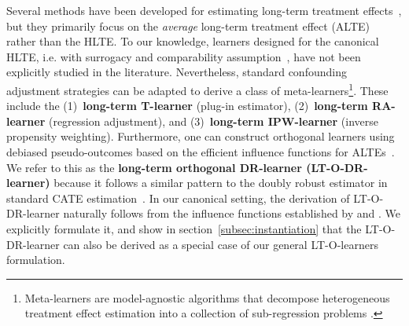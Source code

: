\documentclass{article}
\theoremstyle{plain}
\theoremstyle{definition}
\theoremstyle{remark}
\newcommand{\1}{\mathds{1}}                %
\newcommand{\methods}{LT-O-learners\xspace}
\newcommand{\DR}{LT-O-DR-learner\xspace}
\begin{document}
Several methods have been developed for estimating long-term treatment effects~\citep[e.g.,][]{Athey.2016,Chen.2023,Athey.2025}, but they primarily focus on the \textit{average} long-term treatment effect (ALTE) rather than the HLTE. To our knowledge, learners designed for the canonical HLTE, i.e. with surrogacy and comparability assumption~\cite{Athey.2025}, have not been explicitly studied in the literature. Nevertheless, standard confounding adjustment strategies can be adapted to derive a class of meta-learners\footnote{Meta-learners are model-agnostic algorithms that decompose heterogeneous treatment effect estimation into a collection of sub-regression problems \cite{Kunzel.2019, Curth.2021}.}. These include the (1)~\textbf{long-term T-learner} (plug-in estimator), (2)~\textbf{long-term RA-learner} (regression adjustment), and (3)~\textbf{long-term IPW-learner} (inverse propensity weighting). Furthermore, one can construct orthogonal learners using debiased pseudo-outcomes based on the efficient influence functions for ALTEs~\citep{Chen.2025}. We refer to this as the \textbf{long-term orthogonal DR-learner (\DR)} because it follows a similar pattern to the doubly robust estimator in standard CATE estimation~\citep{Kennedy.2020-DR-learner}. In our canonical setting, the derivation of \DR naturally follows from the influence functions established by \citet{Chen.2023} and \citet{Athey.2025}. We explicitly formulate it, and show in section~\ref{subsec:instantiation} that the \DR can also be derived as a special case of our general \methods formulation. 


\end{document}
